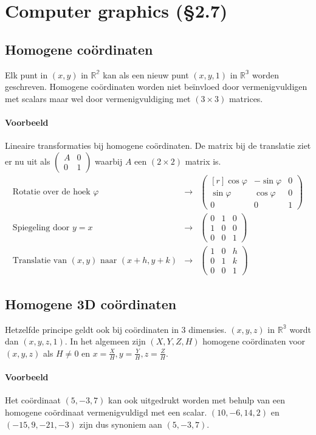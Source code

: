 \section{Computer graphics (\S2.7)}
\subsection{Homogene co\"ordinaten}
Elk punt in $(x, y)$ in $\mathbb{R^2}$ kan als een nieuw punt $(x, y, 1)$ in $\mathbb{R^3}$ worden geschreven. Homogene co\"ordinaten worden niet be\"invloed door vermenigvuldigen met scalars maar wel door vermenigvuldiging met $(3 \times 3)$ matrices.

\paragraph{Voorbeeld} Lineaire transformaties bij homogene co\"ordinaten. De matrix bij de translatie ziet er nu uit als $\begin{pmatrix} A & 0 \\ 0 & 1 \end{pmatrix}$ waarbij $A$ een $(2 \times 2)$ matrix is.
\begin{eqnarray*}
	\mbox{Rotatie over de hoek } \varphi &\to& \begin{pmatrix*}[r]
		\cos \varphi & -\sin \varphi & 0 \\
		\sin \varphi & \cos \varphi & 0 \\
		0 & 0 & 1
	\end{pmatrix*} \\
	\mbox{Spiegeling door } y = x &\to& \begin{pmatrix}
		0 & 1 & 0 \\
		1 & 0 & 0 \\
		0 & 0 & 1
	\end{pmatrix} \\
	\mbox{Translatie van } (x, y) \mbox{ naar } (x+h,y+k) &\to& \begin{pmatrix}
		1 & 0 & h \\
		0 & 1 & k \\
		0 & 0 & 1
	\end{pmatrix}
\end{eqnarray*}

\subsection{Homogene 3D co\"ordinaten}
Hetzelfde principe geldt ook bij co\"ordinaten in 3 dimensies. $(x, y, z)$ in $\mathbb{R^3}$ wordt dan $(x, y, z, 1)$. In het algemeen zijn $(X, Y, Z, H)$ homogene co\"ordinaten voor $(x, y, z)$ als $H \neq 0$ en $x = \frac{X}{H}, y = \frac{Y}{H}, z = \frac{Z}{H}$.
\paragraph{Voorbeeld} Het co\"ordinaat $(5, -3, 7)$ kan ook uitgedrukt worden met behulp van een homogene co\"ordinaat vermenigvuldigd met een scalar. $(10, -6, 14, 2)$ en $(-15, 9, -21, -3)$ zijn dus synoniem aan $(5, -3, 7)$.